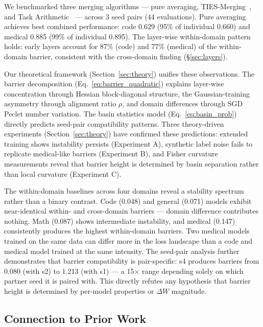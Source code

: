 \documentclass[11pt,a4paper]{article}
\begin{document}
We benchmarked three merging algorithms — pure averaging, TIES-Merging~\cite{yadav2023ties}, and Task Arithmetic~\cite{ilharco2023editing} — across 3 seed pairs (44 evaluations). Pure averaging achieves best combined performance: code 0.629 (95\% of individual 0.660) and medical 0.885 (99\% of individual 0.895). The layer-wise within-domain pattern holds: early layers account for 87\% (code) and 77\% (medical) of the within-domain barrier, consistent with the cross-domain finding (\S\ref{sec:layers}).

Our theoretical framework (Section~\ref{sec:theory}) unifies these observations. The barrier decomposition (Eq.~\ref{eq:barrier_quadratic}) explains layer-wise concentration through Hessian block-diagonal structure, the Gaussian-training asymmetry through alignment ratio $\rho$, and domain differences through SGD Peclet number variation. The basin statistics model (Eq.~\ref{eq:basin_prob}) directly predicts seed-pair compatibility patterns. Three theory-driven experiments (Section~\ref{sec:theory}) have confirmed these predictions: extended training shows instability persists (Experiment A), synthetic label noise fails to replicate medical-like barriers (Experiment B), and Fisher curvature measurements reveal that barrier height is determined by basin separation rather than local curvature (Experiment C).

The within-domain baselines across four domains reveal a stability spectrum rather than a binary contrast. Code (0.048) and general (0.071) models exhibit near-identical within- and cross-domain barriers — domain difference contributes nothing. Math (0.087) shows intermediate instability, and medical (0.147) consistently produces the highest within-domain barriers. Two medical models trained on the same data can differ more in the loss landscape than a code and medical model trained at the same intensity. The seed-pair analysis further demonstrates that barrier compatibility is pair-specific: s4 produces barriers from 0.080 (with s2) to 1.213 (with s1) — a 15$\times$ range depending solely on which partner seed it is paired with. This directly refutes any hypothesis that barrier height is determined by per-model properties or $\Delta W$ magnitude.

\subsection{Connection to Prior Work}
\end{document}
